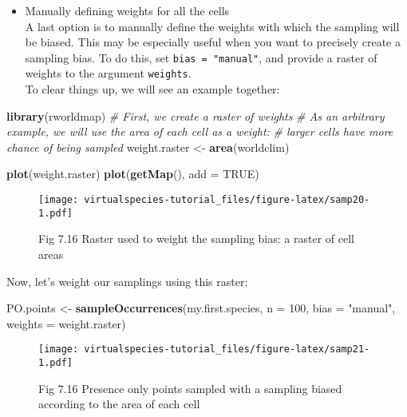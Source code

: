 \documentclass[]{article}
\newenvironment{Shaded}{\begin{snugshade}}{\end{snugshade}}
\newcommand{\KeywordTok}[1]{\textcolor[rgb]{0.13,0.29,0.53}{\textbf{#1}}}
\newcommand{\DataTypeTok}[1]{\textcolor[rgb]{0.13,0.29,0.53}{#1}}
\newcommand{\DecValTok}[1]{\textcolor[rgb]{0.00,0.00,0.81}{#1}}
\newcommand{\StringTok}[1]{\textcolor[rgb]{0.31,0.60,0.02}{#1}}
\newcommand{\CommentTok}[1]{\textcolor[rgb]{0.56,0.35,0.01}{\textit{#1}}}
\newcommand{\OtherTok}[1]{\textcolor[rgb]{0.56,0.35,0.01}{#1}}
\newcommand{\NormalTok}[1]{#1}
\providecommand{\tightlist}{%
  \setlength{\itemsep}{0pt}\setlength{\parskip}{0pt}}
\begin{document}
\begin{itemize}
\tightlist
\item
  Manually defining weights for all the cells\\
  A last option is to manually define the weights with which the
  sampling will be biased. This may be especially useful when you want
  to precisely create a sampling bias. To do this, set
  \texttt{bias\ =\ "manual"}, and provide a raster of weights to the
  argument \texttt{weights}.\\
  To clear things up, we will see an example together:
\end{itemize}

\begin{Shaded}
\begin{Highlighting}[]
\KeywordTok{library}\NormalTok{(rworldmap)}
\CommentTok{# First, we create a raster of weights}
\CommentTok{# As an arbitrary example, we will use the area of each cell as a weight:}
\CommentTok{# larger cells have more chance of being sampled}
\NormalTok{weight.raster <-}\StringTok{ }\KeywordTok{area}\NormalTok{(worldclim)}

\KeywordTok{plot}\NormalTok{(weight.raster)}
\KeywordTok{plot}\NormalTok{(}\KeywordTok{getMap}\NormalTok{(), }\DataTypeTok{add =} \OtherTok{TRUE}\NormalTok{)}
\end{Highlighting}
\end{Shaded}

\begin{figure}
\centering
\texttt{[image: virtualspecies-tutorial\_files/figure-latex/samp20-1.pdf]}
\caption{Fig 7.16 Raster used to weight the sampling bias: a raster of
cell areas}
\end{figure}

Now, let's weight our samplings using this raster:

\begin{Shaded}
\begin{Highlighting}[]
\NormalTok{PO.points <-}\StringTok{ }\KeywordTok{sampleOccurrences}\NormalTok{(my.first.species,}
                               \DataTypeTok{n =} \DecValTok{100}\NormalTok{, }
                               \DataTypeTok{bias =} \StringTok{"manual"}\NormalTok{,}
                               \DataTypeTok{weights =}\NormalTok{ weight.raster)}
\end{Highlighting}
\end{Shaded}

\begin{figure}
\centering
\texttt{[image: virtualspecies-tutorial\_files/figure-latex/samp21-1.pdf]}
\caption{Fig 7.16 Presence only points sampled with a sampling biased
according to the area of each cell}
\end{figure}
\end{document}
